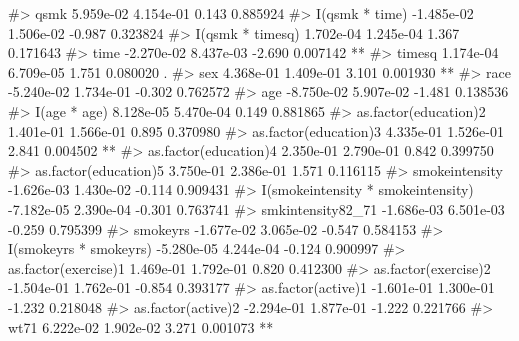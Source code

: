 \documentclass[
  10pt,
  a4paper,
]{book}
\newenvironment{Shaded}{\begin{snugshade}}{\end{snugshade}}
\newcommand{\CommentTok}[1]{\textcolor[rgb]{0.37,0.37,0.37}{#1}}
\begin{document}
\begin{Shaded}
\begin{Highlighting}[]
\CommentTok{\#\textgreater{} qsmk                                5.959e{-}02  4.154e{-}01   0.143 0.885924    }
\CommentTok{\#\textgreater{} I(qsmk * time)                     {-}1.485e{-}02  1.506e{-}02  {-}0.987 0.323824    }
\CommentTok{\#\textgreater{} I(qsmk * timesq)                    1.702e{-}04  1.245e{-}04   1.367 0.171643    }
\CommentTok{\#\textgreater{} time                               {-}2.270e{-}02  8.437e{-}03  {-}2.690 0.007142 ** }
\CommentTok{\#\textgreater{} timesq                              1.174e{-}04  6.709e{-}05   1.751 0.080020 .  }
\CommentTok{\#\textgreater{} sex                                 4.368e{-}01  1.409e{-}01   3.101 0.001930 ** }
\CommentTok{\#\textgreater{} race                               {-}5.240e{-}02  1.734e{-}01  {-}0.302 0.762572    }
\CommentTok{\#\textgreater{} age                                {-}8.750e{-}02  5.907e{-}02  {-}1.481 0.138536    }
\CommentTok{\#\textgreater{} I(age * age)                        8.128e{-}05  5.470e{-}04   0.149 0.881865    }
\CommentTok{\#\textgreater{} as.factor(education)2               1.401e{-}01  1.566e{-}01   0.895 0.370980    }
\CommentTok{\#\textgreater{} as.factor(education)3               4.335e{-}01  1.526e{-}01   2.841 0.004502 ** }
\CommentTok{\#\textgreater{} as.factor(education)4               2.350e{-}01  2.790e{-}01   0.842 0.399750    }
\CommentTok{\#\textgreater{} as.factor(education)5               3.750e{-}01  2.386e{-}01   1.571 0.116115    }
\CommentTok{\#\textgreater{} smokeintensity                     {-}1.626e{-}03  1.430e{-}02  {-}0.114 0.909431    }
\CommentTok{\#\textgreater{} I(smokeintensity * smokeintensity) {-}7.182e{-}05  2.390e{-}04  {-}0.301 0.763741    }
\CommentTok{\#\textgreater{} smkintensity82\_71                  {-}1.686e{-}03  6.501e{-}03  {-}0.259 0.795399    }
\CommentTok{\#\textgreater{} smokeyrs                           {-}1.677e{-}02  3.065e{-}02  {-}0.547 0.584153    }
\CommentTok{\#\textgreater{} I(smokeyrs * smokeyrs)             {-}5.280e{-}05  4.244e{-}04  {-}0.124 0.900997    }
\CommentTok{\#\textgreater{} as.factor(exercise)1                1.469e{-}01  1.792e{-}01   0.820 0.412300    }
\CommentTok{\#\textgreater{} as.factor(exercise)2               {-}1.504e{-}01  1.762e{-}01  {-}0.854 0.393177    }
\CommentTok{\#\textgreater{} as.factor(active)1                 {-}1.601e{-}01  1.300e{-}01  {-}1.232 0.218048    }
\CommentTok{\#\textgreater{} as.factor(active)2                 {-}2.294e{-}01  1.877e{-}01  {-}1.222 0.221766    }
\CommentTok{\#\textgreater{} wt71                                6.222e{-}02  1.902e{-}02   3.271 0.001073 ** }

\end{Highlighting}
\end{Shaded}
\end{document}
